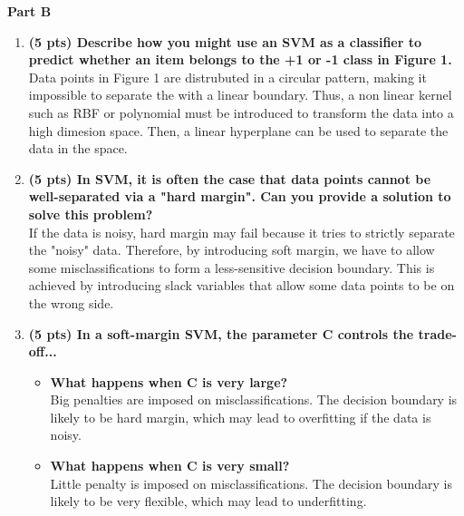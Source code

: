 \documentclass[12pt]{article}
\begin{document}
\vspace{1em}
\textbf{Part B}
\begin{enumerate}[label=(\alph*), start=4]
    \item \textbf{(5 pts) Describe how you might use an SVM as a classifier to predict whether an item belongs to the +1 or -1 class in Figure 1.}
    \\
    Data points in Figure 1 are distrubuted in a circular pattern, making it impossible to separate the with a linear boundary.
    Thus, a non linear kernel such as RBF or polynomial must be introduced to transform the data into a high dimesion space.
    Then, a linear hyperplane can be used to separate the data in the space.

    \item \textbf{(5 pts) In SVM, it is often the case that data points cannot be well-separated via a "hard margin". Can you provide a solution to solve this problem?}
    \\
    If the data is noisy, hard margin may fail because it tries to strictly separate the "noisy" data.
    Therefore, by introducing soft margin, we have to allow some misclassifications to form a less-sensitive decision boundary.
    This is achieved by introducing slack variables that allow some data points to be on the wrong side.

    \item \textbf{(5 pts) In a soft-margin SVM, the parameter C controls the trade-off...}
    \begin{itemize}
        \item \textbf{What happens when C is very large?}
        \\
        Big penalties are imposed on misclassifications. 
        The decision boundary is likely to be hard margin, which may lead to overfitting if the data is noisy.
        
        \item \textbf{What happens when C is very small?}
        \\
        Little penalty is imposed on misclassifications.
        The decision boundary is likely to be very flexible, which may lead to underfitting.

    \end{itemize}
\end{enumerate}
\end{document}
